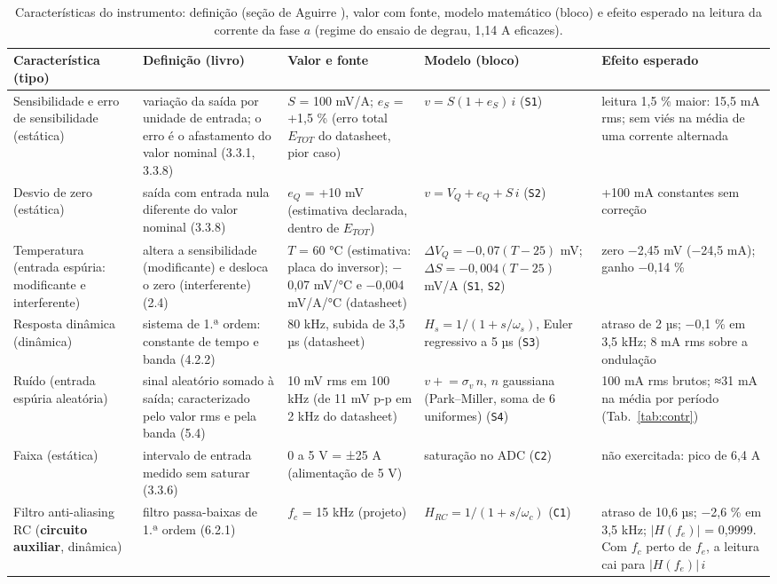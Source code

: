 \documentclass[10pt,a4paper]{article}
\begin{document}
\begin{table}[!htbp]\centering\scriptsize\setlength{\tabcolsep}{3pt}
\caption{Características do instrumento: definição (seção de Aguirre \cite{aguirre}), valor com fonte, modelo matemático (bloco) e efeito esperado na leitura da corrente da fase $a$ (regime do ensaio de degrau, 1,14 A eficazes).}\label{tab:car}
\begin{tabularx}{\textwidth}{p{2.3cm}p{3.2cm}p{2.9cm}p{3.6cm}Y}\toprule
Característica (tipo) & Definição (livro) & Valor e fonte & Modelo (bloco) & Efeito esperado\\\midrule
Sensibilidade e erro de sensibilidade (estática) & variação da saída por unidade de entrada; o erro é o afastamento do valor nominal (3.3.1, 3.3.8) & $S$ = 100 mV/A; $e_S$ = +1,5 \% (erro total $E_{TOT}$ do datasheet, pior caso) & $v = S(1+e_S)\,i$ (\texttt{S1}) & leitura 1,5 \% maior: 15,5 mA rms; sem viés na média de uma corrente alternada\\
Desvio de zero (estática) & saída com entrada nula diferente do valor nominal (3.3.8) & $e_Q$ = +10 mV (estimativa declarada, dentro de $E_{TOT}$) & $v = V_Q + e_Q + S\,i$ (\texttt{S2}) & +100 mA constantes sem correção\\
Temperatura (entrada espúria: modificante e interferente) & altera a sensibilidade (modificante) e desloca o zero (interferente) (2.4) & $T$ = 60 °C (estimativa: placa do inversor); $-$0,07 mV/°C e $-$0,004 mV/A/°C (datasheet) & $\Delta V_Q = -0{,}07(T-25)$ mV; $\Delta S = -0{,}004(T-25)$ mV/A (\texttt{S1}, \texttt{S2}) & zero $-$2,45 mV ($-$24,5 mA); ganho $-$0,14 \%\\
Resposta dinâmica (dinâmica) & sistema de 1.ª ordem: constante de tempo e banda (4.2.2) & 80 kHz, subida de 3,5 µs (datasheet) & $H_s = 1/(1+s/\omega_s)$, Euler regressivo a 5 µs (\texttt{S3}) & atraso de 2 µs; $-$0,1 \% em 3,5 kHz; 8 mA rms sobre a ondulação\\
Ruído (entrada espúria aleatória) & sinal aleatório somado à saída; caracterizado pelo valor rms e pela banda (5.4) & 10 mV rms em 100 kHz (de 11 mV p-p em 2 kHz do datasheet) & $v \mathrel{+}= \sigma_v\,n$, $n$ gaussiana (Park–Miller, soma de 6 uniformes) (\texttt{S4}) & 100 mA rms brutos; ≈31 mA na média por período (Tab.~\ref{tab:contr})\\
Faixa (estática) & intervalo de entrada medido sem saturar (3.3.6) & 0 a 5 V = ±25 A (alimentação de 5 V) & saturação no ADC (\texttt{C2}) & não exercitada: pico de 6,4 A\\
Filtro anti-aliasing RC (\textbf{circuito auxiliar}, dinâmica) & filtro passa-baixas de 1.ª ordem (6.2.1) & $f_c$ = 15 kHz (projeto) & $H_{RC} = 1/(1+s/\omega_c)$ (\texttt{C1}) & atraso de 10,6 µs; $-$2,6 \% em 3,5 kHz; $|H(f_e)|$ = 0,9999. Com $f_c$ perto de $f_e$, a leitura cai para $|H(f_e)|\,i$\\

\end{tabularx}
\end{table}
\end{document}
